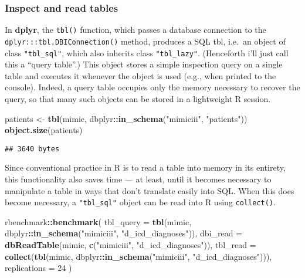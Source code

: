 \documentclass[]{article}
\newenvironment{Shaded}{\begin{snugshade}}{\end{snugshade}}
\newcommand{\KeywordTok}[1]{\textcolor[rgb]{0.13,0.29,0.53}{\textbf{#1}}}
\newcommand{\DataTypeTok}[1]{\textcolor[rgb]{0.13,0.29,0.53}{#1}}
\newcommand{\DecValTok}[1]{\textcolor[rgb]{0.00,0.00,0.81}{#1}}
\newcommand{\StringTok}[1]{\textcolor[rgb]{0.31,0.60,0.02}{#1}}
\newcommand{\OperatorTok}[1]{\textcolor[rgb]{0.81,0.36,0.00}{\textbf{#1}}}
\newcommand{\NormalTok}[1]{#1}
\begin{document}
\subsubsection{Inspect and read tables}\label{inspect-and-read-tables}

In \textbf{dplyr}, the \texttt{tbl()} function, which passes a database
connection to the \texttt{dplyr:::tbl.DBIConnection()} method, produces
a SQL tbl, i.e.~an object of class \texttt{"tbl\_sql"}, which also
inherits class \texttt{"tbl\_lazy"}. (Henceforth i'll just call this a
``query table''.) This object stores a simple inspection query on a
single table and executes it whenever the object is used (e.g., when
printed to the console). Indeed, a query table occupies only the memory
necessary to recover the query, so that many such objects can be stored
in a lightweight R session.

\begin{Shaded}
\begin{Highlighting}[]
\NormalTok{patients <-}\StringTok{ }\KeywordTok{tbl}\NormalTok{(mimic, dbplyr}\OperatorTok{::}\KeywordTok{in_schema}\NormalTok{(}\StringTok{"mimiciii"}\NormalTok{, }\StringTok{"patients"}\NormalTok{))}
\KeywordTok{object.size}\NormalTok{(patients)}
\end{Highlighting}
\end{Shaded}

\begin{verbatim}
## 3640 bytes
\end{verbatim}

Since conventional practice in R is to read a table into memory in its
entirety, this functionality also saves time --- at least, until it
becomes necessary to manipulate a table in ways that don't translate
easily into SQL. When this does become necessary, a \texttt{"tbl\_sql"}
object can be read into R using \texttt{collect()}.

\begin{Shaded}
\begin{Highlighting}[]
\NormalTok{rbenchmark}\OperatorTok{::}\KeywordTok{benchmark}\NormalTok{(}
  \DataTypeTok{tbl_query =} \KeywordTok{tbl}\NormalTok{(mimic, dbplyr}\OperatorTok{::}\KeywordTok{in_schema}\NormalTok{(}\StringTok{"mimiciii"}\NormalTok{, }\StringTok{"d_icd_diagnoses"}\NormalTok{)),}
  \DataTypeTok{dbi_read =} \KeywordTok{dbReadTable}\NormalTok{(mimic, }\KeywordTok{c}\NormalTok{(}\StringTok{"mimiciii"}\NormalTok{, }\StringTok{"d_icd_diagnoses"}\NormalTok{)),}
  \DataTypeTok{tbl_read =} \KeywordTok{collect}\NormalTok{(}\KeywordTok{tbl}\NormalTok{(mimic, dbplyr}\OperatorTok{::}\KeywordTok{in_schema}\NormalTok{(}\StringTok{"mimiciii"}\NormalTok{, }\StringTok{"d_icd_diagnoses"}\NormalTok{))),}
  \DataTypeTok{replications =} \DecValTok{24}
\NormalTok{)}
\end{Highlighting}
\end{Shaded}
\end{document}
